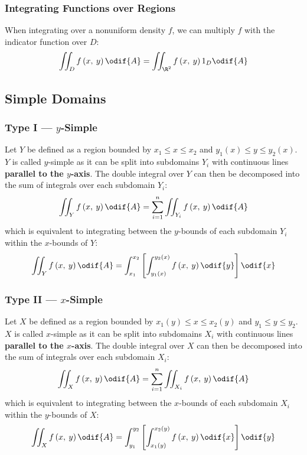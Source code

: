 \documentclass{article}
\begin{document}
\subsubsection{Integrating Functions over Regions}
When integrating over a nonuniform density \(f\), we can multiply \(f\)
with the indicator function over \(D\):
\begin{equation*}
    \iint_D f\left( x,\: y \right) \odif{A} = \iint_{\R^2} f\left( x,\: y \right) 1_D \odif{A}
\end{equation*}
\subsection{Simple Domains}
\subsubsection{Type I --- \texorpdfstring{\(y\)}{y}-Simple}
Let \(Y\) be defined as a region bounded by
\(x_1 \leqslant x \leqslant x_2\) and
\(y_1\left( x \right) \leqslant y \leqslant y_2\left( x \right)\).
\(Y\) is called \(y\)-simple as it can be split into subdomains \(Y_i\)
with continuous lines \textbf{parallel to the \(y\)-axis}.
The double integral over \(Y\) can then be decomposed into the sum of
integrals over each subdomain \(Y_i\):
\begin{equation*}
    \iint_Y f\left( x,\: y \right) \odif{A} = \sum_{i = 1}^n \iint_{Y_i} f\left( x,\: y \right) \odif{A}
\end{equation*}
which is equivalent to integrating between the \(y\)-bounds of each
subdomain \(Y_i\) within the \(x\)-bounds of \(Y\):
\begin{equation*}
    \iint_Y f\left( x,\: y \right) \odif{A} = \int_{x_1}^{x_2} \left[ \int_{y_1\left( x \right)}^{y_2\left( x \right)} f\left( x,\: y \right) \odif{y} \right] \odif{x}
\end{equation*}
\subsubsection{Type II --- \texorpdfstring{\(x\)}{x}-Simple}
Let \(X\) be defined as a region bounded by
\(x_1\left( y \right) \leqslant x \leqslant x_2\left( y \right)\) and
\(y_1 \leqslant y \leqslant y_2\).
\(X\) is called \(x\)-simple as it can be split into subdomains \(X_i\)
with continuous lines \textbf{parallel to the \(x\)-axis}.
The double integral over \(X\) can then be decomposed into the sum of
integrals over each subdomain \(X_i\):
\begin{equation*}
    \iint_X f\left( x,\: y \right) \odif{A} = \sum_{i = 1}^n \iint_{X_i} f\left( x,\: y \right) \odif{A}
\end{equation*}
which is equivalent to integrating between the \(x\)-bounds of each
subdomain \(X_i\) within the \(y\)-bounds of \(X\):
\begin{equation*}
    \iint_X f\left( x,\: y \right) \odif{A} = \int_{y_1}^{y_2} \left[ \int_{x_1\left( y \right)}^{x_2\left( y \right)} f\left( x,\: y \right) \odif{x} \right] \odif{y}
\end{equation*}
\end{document}

